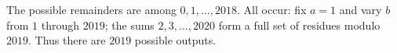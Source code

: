 The possible remainders are among $0,1,\ldots,2018$. All occur: fix $a=1$ and vary $b$ from $1$ through $2019$; the sums $2,3,\ldots,2020$ form a full set of residues modulo $2019$. Thus there are $\boxed{2019}$ possible outputs.
